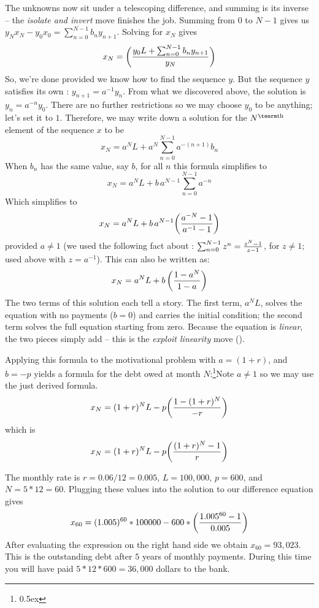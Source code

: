 The unknowns now sit under a telescoping difference, and summing is its
inverse -- the {\it isolate and invert\/} move finishes the job.
Summing from $0$ to $N-1$ gives us $y_N x_N - y_0 x_0 = \sum_{n=0}^{N-1} b_n y_{n+1} $. Solving for $x_N$
gives
$$
x_N = \biggl( {y_0 L + \sum_{n=0}^{N-1} b_n y_{n+1} \over y_N}\biggr)
$$
So, we're done provided we know 
how to find the sequence $y$. But the sequence $y$ 
satisfies its own : $y_{n+1} = a^{-1} y_n$. From what we discovered above, the solution 
is $y_n = a^{-n} y_0$. There are no further restrictions so we may choose 
$y_0$ to be anything; let's set it to $1$. Therefore, we may write down 
a solution for the $N^{\rm th}$ element of the sequence $x$ to be
$$
x_N = a^N L + a^N \sum_{n=0}^{N-1} a^{-(n+1)} b_n
$$
When $b_n$ has the same value, say $b$, for all $n$ this formula simplifies to
$$
x_N = a^N L + b\, a^{N-1} \sum_{n=0}^{N-1} a^{-n}
$$
Which simplifies to 
$$
x_N = a^N L + b\, a^{N-1} \biggl( {a^{-N} - 1 \over a^{-1} - 1} \biggr)
$$ 
provided $a \ne 1$ (we used the following fact about : $\sum_{n=0}^{N-1} z^n = {z^{N} - 1 \over z - 1}$, for $z \ne 1$;
used above with $z = a^{-1}$).
This can also be written as:
$$
x_N = a^N L + b\, \biggl( {1 - a^{N} \over 1 - a} \biggr)
$$
The two terms of this solution each tell a story. The first term, $a^N L$,
solves the equation with no payments ($b = 0$) and carries the initial
condition; the second term solves the full equation starting from zero.
Because the equation is {\it linear\/}, the two pieces simply add -- this is
the {\it exploit linearity\/} move ({\it {}\/}).

Applying this formula to the motivational problem with $a = (1 + r)$, and
$b = -p$ yields a formula for the debt owed at month $N$:\footnote{\kern 0.5pt \raise 0.5ex \hbox{\ddag}}{Note $a \neq 1$ so we may use the just derived formula.}
$$
x_N = (1+r)^N L - p \biggl( {1 - (1+r)^{N}  \over -r} \biggr) 
$$
which is
$$
x_N = (1+r)^N L - p \biggl( {(1+r)^{N} - 1  \over r} \biggr) 
$$


The monthly rate is $r = 0.06 / 12 = 0.005$, $L = 100,000$, $p = 600$, and 
$N = 5 * 12 = 60$. Plugging these values into the solution to our difference 
equation gives
$$
x_{60} = (1.005)^{60} * 100000 - 600 * 
\biggl({1.005^{60} - 1 \over 0.005} \biggr)
$$
After evaluating the expression on the right hand side we obtain
$x_{60} = 93,023$. 
This is the outstanding debt after $5$ years of monthly payments.
During this time you will have paid $5 * 12 * 600 = 36,000$
dollars to the bank.

